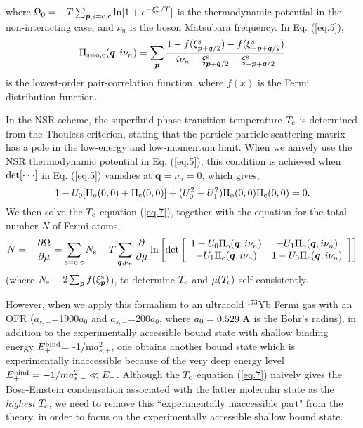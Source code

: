 \documentclass[a4paper]{jpconf}
\begin{document}
where $\Omega_0=-T\sum_{{\bm p},{\rm s}={\rm o,c}}\ln[1+e^{-\xi_{\bm p}^{\rm s}/T}]$ is the thermodynamic potential in the non-interacting case, and $\nu_n$ is the boson Matsubara frequency. In Eq. (\ref{eq.5}), 
\begin{equation}
\Pi_{{\rm s}={\rm o,c}}({\bm q},i\nu_n) = 
\sum_{\bm p}
{
1-f(\xi_{{\bm p}+{\bm q}/2}^{\rm s})-f(\xi_{-{\bm p}+{\bm q}/2}^{\rm s})
\over
i\nu_n-\xi_{{\bm p}+{\bm q}/2}^{\rm s}-\xi_{-{\bm p}+{\bm q}/2}^{\rm s}
}
\label{eq.6}
\end{equation}
is the lowest-order pair-correlation function, where $f(x)$ is the Fermi distribution function. 
\par
In the NSR scheme\cite{NSR}, the superfluid phase transition temperature $T_{\rm c}$ is determined from the Thouless criterion\cite{Thouless}, stating that the particle-particle scattering matrix has a pole in the low-energy and low-momentum limit. When we naively use the NSR thermodynamic potential in Eq. (\ref{eq.5}), this condition is achieved when ${\rm det}[\cdot\cdot\cdot]$ in Eq. (\ref{eq.5}) vanishes at ${\bm q}=\nu_n=0$, which gives,
\begin{equation}
1-U_0
[\Pi_{\rm o}(0,0)+\Pi_{\rm c}(0,0)]+(U_0^2-U_1^2)\Pi_{\rm o}(0,0)\Pi_{\rm c}(0,0)=0.
\label{eq.7}
\end{equation}
We then solve the $T_{\rm c}$-equation (\ref{eq.7}), together with the equation for the total number $N$ of Fermi atoms,
\begin{equation}
N=
-{\partial \Omega \over \partial \mu}=
\sum_{{\rm s}={\rm o.c}}N_{\rm s}
-
T\sum_{{\bm q},\nu_n}
{\partial \over \partial \mu}
\ln 
\left[
\det
\left[
\begin{array}{cc}
1-U_0\Pi_{\rm o}({\bm q},i\nu_n) & -U_1\Pi_{\rm o}({\bm q},i\nu_n) \\
-U_1\Pi_{\rm c}({\bm q},i\nu_n) & 1-U_0\Pi_{\rm c}({\bm q},i\nu_n)
\end{array}
\right]
\right]
\label{eq.8}
\end{equation}
(where $N_{\rm s}=2\sum_{\bm p}f(\xi_{\bm p}^{\rm s})$), to determine $T_{\rm c}$ and $\mu(T_{\rm c})$ self-consistently.
\par
However, when we apply this formalism to an ultracold $^{173}$Yb Fermi gas with an OFR ($a_{s,+}$=1900$a_0$ and $a_{s,-}$=200$a_0$, where $a_0=0.529~{\rm A}$ is the Bohr's radius\cite{Inguscio,Bloch2}), in addition to the experimentally accessible bound state with shallow binding energy $E_+^{\rm bind}$= -1/m$a_{s,+}^2$, one obtains another bound state which is experimentally inaccessible because of the very deep energy level $E_+^{\rm bind}=-1/ma_{s,-}^2\ll E_-$\cite{HuiHu}. Although the $T_{\rm c}$ equation (\ref{eq.7}) naively gives the Bose-Einstein condensation associated with the latter molecular state as the {\it highest} $T_{\rm c}$, we need to remove this ``experimentally inaccessible part" from the theory, in order to focus on the experimentally accessible shallow bound state.
\end{document}
